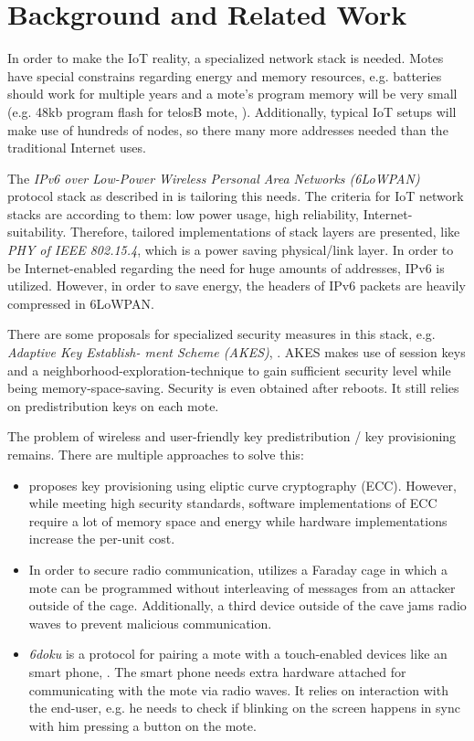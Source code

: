 \documentclass{sig-alternate} %
\begin{document}
\section{Background and Related Work}
\label{sec:related_work}

In order to make the IoT reality, a specialized network stack is needed.
Motes have special constrains regarding energy and memory resources, e.g. batteries should work for multiple years and a mote's program memory will be very small (e.g. 48kb program flash for telosB mote, \cite{telosb}).
Additionally, typical IoT setups will make use of hundreds of nodes, so there many more addresses needed than the traditional Internet uses.

The \textit{IPv6 over Low-Power Wireless Personal Area Networks (6LoWPAN)} protocol stack as described in \cite{palattella2013standardized} is tailoring this needs.
The criteria for IoT network stacks are according to them: low power usage, high reliability, Internet-suitability.
Therefore, tailored implementations of stack layers are presented, like \textit{PHY of IEEE 802.15.4}, which is a power saving physical/link layer.
In order to be Internet-enabled regarding the need for huge amounts of addresses, IPv6 is utilized.
However, in order to save energy, the headers of IPv6 packets are heavily compressed in 6LoWPAN.

There are some proposals for specialized security measures in this stack, e.g. \textit{Adaptive Key Establish- ment Scheme (AKES)}, \cite{krentz15akes}.
AKES makes use of session keys and a neighborhood-exploration-technique to gain sufficient security level while being memory-space-saving.
Security is even obtained after reboots.
It still relies on predistribution keys on each mote.

The problem of wireless and user-friendly key predistribution / key provisioning remains.
There are multiple approaches to solve this:

\begin{itemize}
	\item \cite{chen2011over} proposes key provisioning using eliptic curve cryptography (ECC). However, while meeting high security standards, software implementations of ECC require a lot of memory space and energy while hardware implementations increase the per-unit cost.
	\item In order to secure radio communication, \cite{kuo2007message} utilizes a Faraday cage in which a mote can be programmed without interleaving of messages from an attacker outside of the cage. Additionally, a third device outside of the cave jams radio waves to prevent malicious communication.
	\item \textit{6doku} is a protocol for pairing  a mote with a touch-enabled devices like an smart phone, \cite{krentz20156doku}. The smart phone needs extra hardware attached for communicating with the mote via radio waves. It relies on interaction with the end-user, e.g. he needs to check if blinking on the screen happens in sync with him pressing a button on the mote.
\end{itemize}
\end{document}
